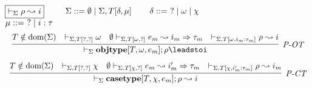 

\begin{figure}[t]
$\fbox{$\vdash_\Sigma \rho \leadsto i$}$
~~~~$\Sigma ::= \emptyset \mathrel{\mid} \Sigma, T[\delta, \mu]$~~~~$\delta ::=~? \mathrel{\mid} \omega \mathrel{\mid} \chi$ ~~~~ $\mu ::=~? \mathrel{\mid} i : \tau$
\[
\begin{array}{c}
\infer[\textit{P-OT}]
          {%
	    \vdash_\Sigma  \keyw{objtype}[T, \omega, e_{m}]; \rho \leadsto%
           i
       }
	  {T \notin \text{dom}(\Sigma) &
	  \vdash_{\Sigma, T[?,?]} \omega &
	   \emptyset \vdash_{\Sigma, T[\omega,?]} e_{m} \leadsto i_{m} \Rightarrow \tau_{m} &  \vdash_{\Sigma, T[\omega, i_{m} : \tau_{m}]} \rho \leadsto i }
	   \\[2ex] 
\infer[\textit{P-CT}]
          {%
	    \vdash_\Sigma \keyw{casetype}[T, \chi, e_m]; \rho \leadsto i
       }
	  {T \notin \text{dom}(\Sigma) & 
	  \vdash_{\Sigma, T[?,?]} \chi &
	  \emptyset \vdash_{\Sigma, T[\chi,?]} e_m \leadsto i_m' \Rightarrow \tau_m 
	   & \vdash_{ \Sigma, T[\chi, i_m' : \tau_m]} \rho \leadsto i_m}
	   \\[2ex] 


\end{array}\]
\end{figure}
